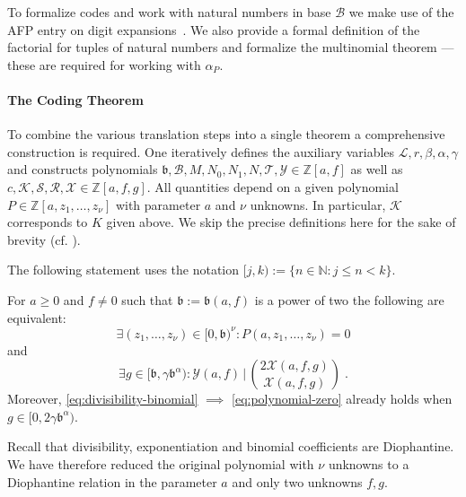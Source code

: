 \documentclass[a4paper,USenglish,cleveref,autoref,thm-restate]{lipics-v2021}
\newcommand{\N}{{\mathbb N}}
\newcommand{\Z}{{\mathbb Z}}
\newcommand{\B}{\mathscr{B}}
\newcommand{\thmIdec}{\mathscr}
\newcommand{\X}{\thmIdec X}
\newcommand{\K}{\thmIdec K}
\newcommand{\Y}{\thmIdec Y}
\newcommand{\bLowercase}{\mathfrak{b}}
\begin{document}
To formalize codes and work with natural numbers in base $\B$ we make use of the AFP entry on digit expansions~\cite{afp-digit-expansions}. We also provide a formal definition of the factorial for tuples of natural numbers and formalize the multinomial theorem --- these are required for working with $\alpha_P$.

\paragraph*{The Coding Theorem}
To combine the various translation steps into a single theorem a comprehensive construction is required. One iteratively defines the auxiliary variables $\mathcal{L}, r, \beta, \alpha, \gamma$ and constructs polynomials $\mathfrak{b}, \mathscr{B}, M, N_0, N_1, N, \mathscr{T}, \Y \in \Z[a, f]$ as well as $c, \mathscr{K}, \mathscr{S}, \mathscr{R}, \X \in \Z[a, f, g]$. All quantities depend on a given polynomial $P \in \Z[a, z_1, \ldots, z_\nu]$ with parameter $a$ and $\nu$ unknowns. In particular, $\K$ corresponds to $K$ given above. We skip the precise definitions here for the sake of brevity (cf. \cite[Definition 2.1]{manuscript}). 

The following statement uses the notation $[j, k) := \{ n \in \N : j \leq n < k \}$.

\begin{theorem} \label{thm:coding}
For $a \ge 0$ and $f \neq 0$ such that $\bLowercase := \bLowercase(a, f)$ is a power of two the following are equivalent:
\begin{equation} \label{eq:polynomial-zero}
	\exists (z_1,\ldots,z_\nu)\in [0, \bLowercase)^\nu \colon 
    P(a, z_1, \ldots, z_\nu) = 0 
\end{equation}
and
\begin{equation} \label{eq:divisibility-binomial}
	\exists g \in [\bLowercase, \gamma \bLowercase^\alpha) \colon  \Y(a, f) \, |\, \binom{2 \X(a, f, g)}{\X(a, f, g)} \;.
\end{equation}
Moreover, \eqref{eq:divisibility-binomial} $\implies $ \eqref{eq:polynomial-zero} already holds when $g \in [0, 2\gamma \bLowercase^\alpha)$.
\end{theorem}

Recall that divisibility, exponentiation and binomial coefficients are Diophantine. We have therefore reduced the original polynomial with $\nu$ unknowns to a Diophantine relation in the parameter $a$ and only two unknowns $f, g$.
\end{document}
